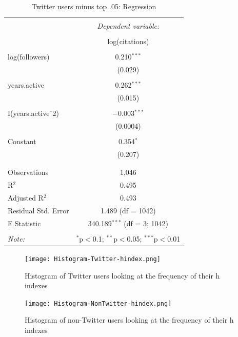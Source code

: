 \documentclass[12pt, Times New Roman]{article}
\begin{document}
\begin{table}[!htbp] \centering 
  \caption{Twitter users minus top .05: Regression} 
  \label{table5} 
\begin{tabular}{@{\extracolsep{5pt}}lc} 
\\[-1.8ex]\hline 
\hline \\[-1.8ex] 
 & \multicolumn{1}{c}{\textit{Dependent variable:}} \\ 
\cline{2-2} 
\\[-1.8ex] & log(citations) \\ 
\hline \\[-1.8ex] 
 log(followers) & 0.210$^{***}$ \\ 
  & (0.029) \\ 
  & \\ 
 years.active & 0.262$^{***}$ \\ 
  & (0.015) \\ 
  & \\ 
 I(years.active$\hat{\mkern6mu}$2) & $-$0.003$^{***}$ \\ 
  & (0.0004) \\ 
  & \\ 
 Constant & 0.354$^{*}$ \\ 
  & (0.207) \\ 
  & \\ 
\hline \\[-1.8ex] 
Observations & 1,046 \\ 
R$^{2}$ & 0.495 \\ 
Adjusted R$^{2}$ & 0.493 \\ 
Residual Std. Error & 1.489 (df = 1042) \\ 
F Statistic & 340.189$^{***}$ (df = 3; 1042) \\ 
\hline 
\hline \\[-1.8ex] 
\textit{Note:}  & \multicolumn{1}{r}{$^{*}$p$<$0.1; $^{**}$p$<$0.05; $^{***}$p$<$0.01} \\ 
\end{tabular} 
\end{table}

\begin{figure}[h]
    \texttt{[image: Histogram-Twitter-hindex.png]}
    \centering
    \caption{Histogram of Twitter users looking at the frequency of their h indexes}
    \label{Hist1}
\end{figure}

\begin{figure}[h]
    \texttt{[image: Histogram-NonTwitter-hindex.png]}
    \centering
    \caption{Histogram of non-Twitter users looking at the frequency of their h indexes}
    \label{Hist2}
\end{figure}
\end{document}

